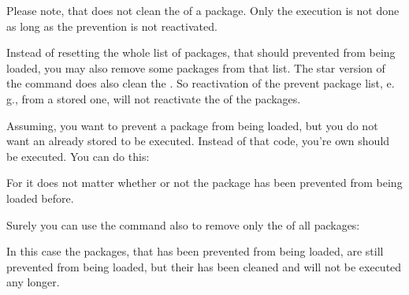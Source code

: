Please note, that 
does not clean the  of a package. Only the execution is not
done as long as the prevention is not reactivated.%
\EndIndexGroup


\begin{Declaration}
\end{Declaration}
Instead of resetting the whole list of
packages, that should prevented from being loaded, you may also remove some
packages from that list. The star version of the command does also clean the
. So reactivation of the prevent package list, e.\,g.,
from a stored one, will not reactivate the  of the
packages.%
%
\begin{Example}
  Assuming, you want to prevent a package  from being loaded, but
  you do not want an already stored  to be
  executed. Instead of that code, you're own  should be
  executed. You can do this:
\begin{lstcode}
\end{lstcode}
  For  it does not matter whether or not
  the package has been prevented from being loaded before.

  Surely you can use the command also to remove only the 
  of all packages:
\begin{lstcode}
  \StorePreventPackageFromLoading\TheWholePreventList
  \UnPreventPackageFromLoading*{\TheWholePreventList}
  \PreventPackageFromLoading{\TheWholePreventList}
\end{lstcode}
  In this case the packages, that has been prevented from being loaded, are
  still prevented from being loaded, but their  has been
  cleaned and will not be executed any longer.%
\end{Example}%
\EndIndexGroup
%
\EndIndexGroup

\endinput


